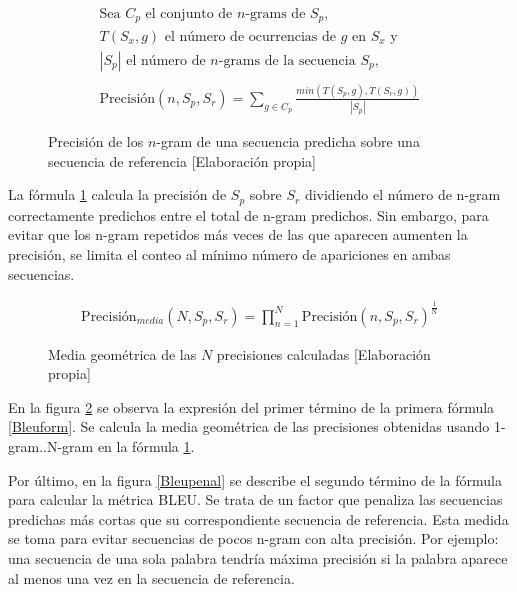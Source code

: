 \begin{figure}[H]
    \begin{align*}
        \text{Sea }C_{p}\text{ el conjunto de }n\text{-grams de }S_{p}\text{,}\\
        T(S_{x}, g)\text{ el número de ocurrencias de }g\text{ en }S_{x}\text{ y}\\
        |S_{p}|\text{ el número de }n\text{-grams de la secuencia }S_{p}\text{,}\\ \\
        \text{Precisión}(n, S_{p}, S_{r}) = \sum_{g\in{C_{p}}}\frac{min(T(S_{p}, g), T(S_{r}, g))}{ |S_{p}| }
    \end{align*}
    \caption{Precisión de los $n$-gram de una secuencia predicha sobre una secuencia de referencia [Elaboración propia]}\label{Bleuprecision}
\end{figure}

La fórmula \ref{Bleuprecision} calcula la precisión de $S_{p}$ sobre $S_{r}$ dividiendo el número de n-gram correctamente predichos entre el total de n-gram predichos. Sin embargo, para evitar que los n-gram repetidos más veces de las que aparecen aumenten la precisión, se limita el conteo al mínimo número de apariciones en ambas secuencias.

\begin{figure}[H]
    \begin{align*}
        \text{Precisión}_{media}(N, S_{p}, S_{r}) = \prod^{N}_{n=1}{\text{Precisión}(n, S_{p}, S_{r})^{\frac{1}{\text{N}}}}
    \end{align*}
    \caption{Media geométrica de las $N$ precisiones calculadas [Elaboración propia]}\label{Bleumean}
\end{figure}

En la figura \ref{Bleumean} se observa la expresión del primer término de la primera fórmula \ref{Bleuform}. Se calcula la media geométrica de las precisiones obtenidas usando 1-gram..N-gram en la fórmula \ref{Bleuprecision}.

Por último, en la figura \ref{Bleupenal} se describe el segundo término de la fórmula para calcular la métrica BLEU. Se trata de un factor que penaliza las secuencias predichas más cortas que su correspondiente secuencia de referencia. Esta medida se toma para evitar secuencias de pocos n-gram con alta precisión. Por ejemplo: una secuencia de una sola palabra tendría máxima precisión si la palabra aparece al menos una vez en la secuencia de referencia.


